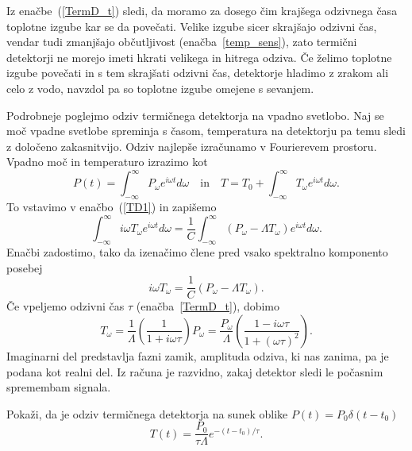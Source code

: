 Iz enačbe~(\ref{TermD_t}) sledi, da moramo za dosego čim krajšega odzivnega časa toplotne izgube 
kar se da povečati. Velike izgube sicer skrajšajo odzivni čas, 
vendar tudi zmanjšajo občutljivost (enačba~\ref{temp_sens}), 
zato termični detektorji ne morejo imeti hkrati velikega in hitrega odziva. 
Če želimo toplotne izgube povečati in s tem skrajšati odzivni čas, detektorje hladimo z zrakom 
ali celo z vodo, navzdol pa so toplotne izgube omejene s sevanjem.  

Podrobneje poglejmo odziv termičnega detektorja na vpadno svetlobo. Naj se  moč vpadne svetlobe
spreminja s časom, temperatura na detektorju pa temu sledi z določeno zakasnitvijo. Odziv
najlepše izračunamo v Fourierevem prostoru. Vpadno moč in temperaturo izrazimo kot
\begin{equation}
P(t) = \int_{-\infty}^{\infty} P_\omega e^{i\omega t}d\omega \quad \mathrm{in} \quad
T = T_0 + \int_{-\infty}^{\infty} T_\omega e^{i\omega t}d\omega.
\label{TermTF}
\end{equation}
To vstavimo v enačbo~(\ref{TD1}) in zapišemo
\begin{equation}
\int_{-\infty}^{\infty} i \omega T_\omega e^{i\omega t}d\omega = \frac{1}{C}
\int_{-\infty}^{\infty} (P_\omega - \Lambda T_\omega) e^{i\omega t}d\omega.
\end{equation}
Enačbi zadostimo, tako da izenačimo člene pred vsako spektralno komponento posebej
\begin{equation}
i \omega T_\omega = \frac{1}{C}\left(P_\omega - \Lambda T_\omega\right).
\end{equation}
Če vpeljemo odzivni čas $\tau$ (enačba~\ref{TermD_t}), dobimo
\begin{equation}
T_\omega = \frac{1}{\Lambda}\left(\frac{1}{1+i \omega \tau}\right)P_\omega = 
\frac{P_\omega}{\Lambda}\left(\frac{1-i \omega \tau}{1+(\omega \tau)^2}\right).
\label{TermOdziv}
\end{equation}
Imaginarni del predstavlja fazni zamik, amplituda odziva, ki nas zanima, pa je 
podana kot realni del. Iz računa je razvidno, zakaj detektor sledi le 
počasnim spremembam signala. 
\begin{definition}
Pokaži, da je odziv termičnega detektorja na sunek oblike $P(t) = P_0\delta(t-t_0)$
\begin{equation}
T(t)=\frac{P_0}{\tau\Lambda}e^{-(t-t_0)/\tau}.
\end{equation}
\end{definition}

